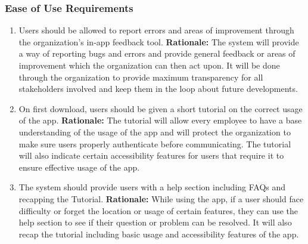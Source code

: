 \documentclass[]{article}
\begin{document}
\subsubsection{Ease of Use Requirements}
\label{ssub:ease_of_use_requirements}
\begin{enumerate}[{UH-EOU}1. ]
	\item Users should be allowed to report errors and areas of improvement through the organization’s in-app feedback tool. \newline
	      \textbf{Rationale:} The system will provide a way of reporting bugs and errors and provide general feedback or areas of improvement which the organization can then act upon. It will be done through the organization to provide maximum transparency for all stakeholders involved and keep them in the loop about future developments.
	\item On first download, users should be given a short tutorial on the correct usage of the app. \newline
	      \textbf{Rationale:} The tutorial will allow every employee to have a base understanding of the usage of the app and will protect the organization to make sure users properly authenticate before communicating. The tutorial will also indicate certain accessibility features for users that require it to ensure effective usage of the app.
	\item  The system should provide users with a help section including FAQs and recapping the Tutorial. \newline
	      \textbf{Rationale:} While using the app, if a user should face difficulty or forget the location or usage of certain features, they can use the help section to see if their question or problem can be resolved. It will also recap the tutorial including basic usage and accessibility features of the app.
\end{enumerate}
\end{document}
